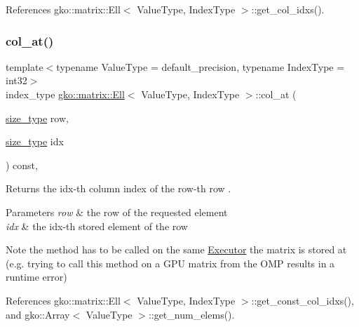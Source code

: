 References gko\+::matrix\+::\+Ell$<$ Value\+Type, Index\+Type $>$\+::get\+\_\+col\+\_\+idxs().

\mbox{\label{classgko_1_1matrix_1_1Ell_a1ac1702011ead4e56857de130b4a5301}} 
\subsubsection{\texorpdfstring{col\+\_\+at()}{col\_at()}\hspace{0.1cm}{\footnotesize\ttfamily [2/2]}}
{\footnotesize\ttfamily template$<$typename Value\+Type = default\+\_\+precision, typename Index\+Type = int32$>$ \\
index\+\_\+type \hyperlink{classgko_1_1matrix_1_1Ell}{gko\+::matrix\+::\+Ell}$<$ Value\+Type, Index\+Type $>$\+::col\+\_\+at (\begin{DoxyParamCaption}\item[{\hyperlink{namespacegko_a6e5c95df0ae4e47aab2f604a22d98ee7}{size\+\_\+type}}]{row,  }\item[{\hyperlink{namespacegko_a6e5c95df0ae4e47aab2f604a22d98ee7}{size\+\_\+type}}]{idx }\end{DoxyParamCaption}) const\hspace{0.3cm}{\ttfamily [inline]}, {\ttfamily [noexcept]}}



Returns the {\ttfamily idx}-\/th column index of the {\ttfamily row}-\/th row . 


\begin{DoxyParams}{Parameters}
{\em row} & the row of the requested element \\
\hline
{\em idx} & the idx-\/th stored element of the row\\
\hline
\end{DoxyParams}
\begin{DoxyNote}{Note}
the method has to be called on the same \hyperlink{classgko_1_1Executor}{Executor} the matrix is stored at (e.\+g. trying to call this method on a G\+PU matrix from the O\+MP results in a runtime error) 
\end{DoxyNote}


References gko\+::matrix\+::\+Ell$<$ Value\+Type, Index\+Type $>$\+::get\+\_\+const\+\_\+col\+\_\+idxs(), and gko\+::\+Array$<$ Value\+Type $>$\+::get\+\_\+num\+\_\+elems().

